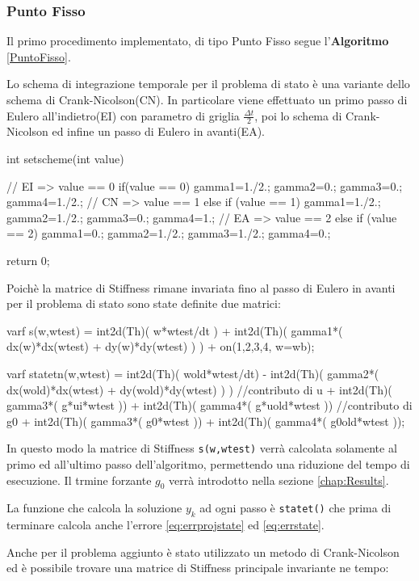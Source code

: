 \subsubsection{Punto Fisso}
Il primo procedimento implementato, di tipo Punto Fisso segue l'\textbf{Algoritmo} \ref{PuntoFisso}.
\par
Lo schema di integrazione temporale per il problema di stato è una variante dello schema di Crank-Nicolson(CN). In particolare viene effettuato un primo passo di Eulero all'indietro(EI) con parametro di griglia $\frac{{\Delta}t}{2}$, poi lo schema di Crank-Nicolson ed infine un passo di Eulero in avanti(EA).
\begin{Code}[caption={Funzione \texttt{setscheme()}}]
int setscheme(int value)
{
	// EI => value == 0
	if(value == 0)
	{
	    gamma1=1./2.;
	    gamma2=0.;
	    gamma3=0.;
	    gamma4=1./2.;
	}
	// CN => value == 1
	else if (value == 1)
	{	
		gamma1=1./2.;
	    gamma2=1./2.;
	    gamma3=0.;
	    gamma4=1.;
	}
	// EA => value == 2
	else if (value == 2)
	{
		gamma1=0.;
	    gamma2=1./2.;
	    gamma3=1./2.;
	    gamma4=0.;
	}
	
	return 0;
}
\end{Code}
Poichè la matrice di Stiffness rimane invariata fino al passo di Eulero in avanti per il problema di stato sono state definite due matrici:
\begin{Code}[caption={Matrici \texttt{s(w,wtest)} e \texttt{statetn(w,wtest)}}]
varf s(w,wtest) =   int2d(Th)( w*wtest/dt )
	        	  + int2d(Th)( gamma1*( dx(w)*dx(wtest) + dy(w)*dy(wtest) ) )
				  + on(1,2,3,4, w=wb);

varf statetn(w,wtest) =   int2d(Th)( wold*wtest/dt)
				  		- int2d(Th)( gamma2*(   dx(wold)*dx(wtest) 
				  							 + dy(wold)*dy(wtest) ) )
							//contributo di u
						+ int2d(Th)( gamma3*( g*ui*wtest ))
				 		+ int2d(Th)( gamma4*( g*uold*wtest ))
							//contributo di g0
						+ int2d(Th)( gamma3*( g0*wtest ))
				 		+ int2d(Th)( gamma4*( g0old*wtest ));
\end{Code}
In questo modo la matrice di Stiffness \texttt{s(w,wtest)} verrà calcolata solamente al primo ed all'ultimo passo dell'algoritmo, permettendo una riduzione del tempo di esecuzione. Il trmine forzante $g_0$ verrà introdotto nella sezione \ref{chap:Results}.
\par
La funzione che calcola la soluzione $y_k$ ad ogni passo è \texttt{statet()} che prima di terminare calcola anche l'errore \eqref{eq:errprojstate} ed \eqref{eq:errstate}.
\par
Anche per il problema aggiunto è stato utilizzato un metodo di Crank-Nicolson ed è possibile trovare una matrice di Stiffness principale invariante ne tempo:
